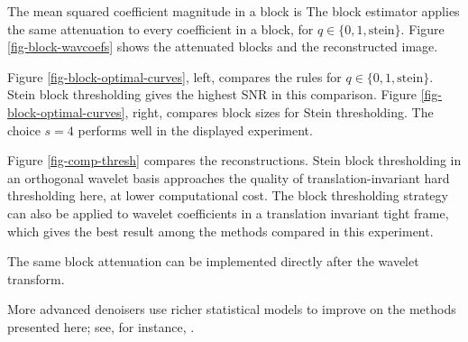 The mean squared coefficient magnitude in a block is
The block estimator
applies the same attenuation to every coefficient in a block,
for $q \in \{0,1,\text{stein}\}$.
Figure \ref{fig-block-wavcoefs} shows the attenuated blocks and the reconstructed image.


Figure \ref{fig-block-optimal-curves}, left, compares the rules for $q \in \{0,1,\text{stein}\}$. Stein block thresholding gives the highest SNR in this comparison.
Figure \ref{fig-block-optimal-curves}, right, compares block sizes for Stein thresholding. The choice $s=4$ performs well in the displayed experiment.


Figure \ref{fig-comp-thresh} compares the reconstructions. Stein block thresholding in an orthogonal wavelet basis approaches the quality of translation-invariant hard thresholding here, at lower computational cost.
The block thresholding strategy can also be applied to wavelet coefficients in a translation invariant tight frame, which gives the best result among the methods compared in this experiment.

The same block attenuation can be implemented directly after the wavelet transform.


More advanced denoisers use richer statistical models to improve on the methods presented here; see, for instance, \cite{portilla-denoise}.


